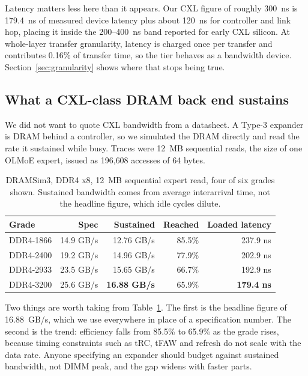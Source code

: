 \documentclass[10pt,a4paper]{article}
\begin{document}
Latency matters less here than it appears. Our CXL figure of roughly 300~ns
is 179.4~ns of measured device latency plus about 120~ns for controller and link
hop, placing it inside the 200--400~ns band reported for early CXL silicon. At
whole-layer transfer granularity, latency is charged once per transfer and
contributes 0.16\% of transfer time, so the tier behaves as a bandwidth device.
Section~\ref{sec:granularity} shows where that stops being true.

\subsection{What a CXL-class DRAM back end sustains}

We did not want to quote CXL bandwidth from a datasheet. A Type-3 expander is DRAM
behind a controller, so we simulated the DRAM directly and read the rate it
sustained while busy. Traces were 12~MB sequential reads, the size of one OLMoE
expert, issued as 196{,}608 accesses of 64 bytes.

\begin{table}[htbp]
\centering\small
\caption{DRAMSim3, DDR4 x8, 12~MB sequential expert read, four of six grades shown.
Sustained bandwidth comes from average interarrival time, not the headline
figure, which idle cycles dilute.}
\label{tab:dram}
\begin{tabular}{lrrrr}
\toprule
Grade & Spec & Sustained & Reached & Loaded latency \\
\midrule
DDR4-1866 & 14.9 GB/s & 12.76 GB/s & 85.5\% & 237.9 ns \\
DDR4-2400 & 19.2 GB/s & 14.96 GB/s & 77.9\% & 202.9 ns \\
DDR4-2933 & 23.5 GB/s & 15.65 GB/s & 66.7\% & 192.9 ns \\
DDR4-3200 & 25.6 GB/s & \textbf{16.88 GB/s} & 65.9\% & \textbf{179.4 ns} \\
\bottomrule
\end{tabular}
\end{table}

Two things are worth taking from Table~\ref{tab:dram}. The first is the headline
figure of 16.88~GB/s, which we use everywhere in place of a specification number.
The second is the trend: efficiency falls from 85.5\% to 65.9\% as the grade
rises, because timing constraints such as tRC, tFAW and refresh do not scale with
the data rate. Anyone specifying an expander should budget against sustained
bandwidth, not DIMM peak, and the gap widens with faster parts.
\end{document}
